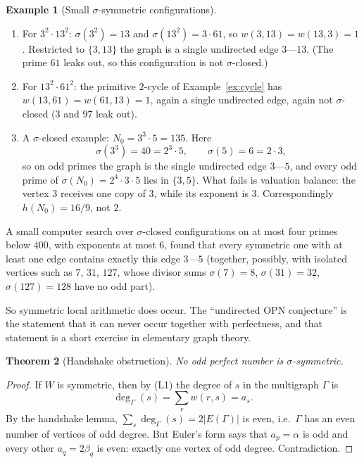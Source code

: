 \documentclass[11pt]{article}
\newtheorem{theorem}{Theorem}[section]
\theoremstyle{definition}
\newtheorem{example}[theorem]{Example}
\theoremstyle{remark}
\begin{document}
\begin{example}[Small $\sigma$-symmetric configurations]\label{ex:symmetric}
\begin{enumerate}[label=(\alph*)]
\item For $3^2\cdot13^2$: $\sigma(3^2)=13$ and $\sigma(13^2)=3\cdot61$, so
  $w(3,13)=w(13,3)=1$.  Restricted to $\{3,13\}$ the graph is a single
  undirected edge $3$---$13$.  (The prime $61$ leaks out, so this
  configuration is not $\sigma$-closed.)
\item For $13^2\cdot61^2$: the primitive $2$-cycle of
  Example~\ref{ex:cycle} has $w(13,61)=w(61,13)=1$, again a single
  undirected edge, again not $\sigma$-closed ($3$ and $97$ leak out).
\item A $\sigma$-closed example: $N_0=3^3\cdot5=135$.  Here
  \[
  \sigma(3^3)=40=2^3\cdot5,\qquad\sigma(5)=6=2\cdot3,
  \]
  so on odd primes the graph is the single undirected edge $3$---$5$, and
  every odd prime of $\sigma(N_0)=2^4\cdot3\cdot5$ lies in $\{3,5\}$.  What
  fails is valuation balance: the vertex $3$ receives one copy of $3$, while
  its exponent is $3$.  Correspondingly $h(N_0)=16/9$, not $2$.
\end{enumerate}
A small computer search over $\sigma$-closed configurations on at most four
primes below $400$, with exponents at most $6$, found that every symmetric one
with at least one edge contains exactly this edge $3$---$5$ (together, possibly,
with isolated vertices such as $7$, $31$, $127$, whose divisor sums
$\sigma(7)=8$, $\sigma(31)=32$, $\sigma(127)=128$ have no odd part).
\end{example}

So symmetric local arithmetic does occur.  The ``undirected OPN conjecture''
is the statement that it can never occur together with perfectness, and that
statement is a short exercise in elementary graph theory.

\begin{theorem}[Handshake obstruction]\label{thm:handshake}
No odd perfect number is $\sigma$-symmetric.
\end{theorem}

\begin{proof}
If $W$ is symmetric, then by (L1) the degree of $s$ in the multigraph
$\Gamma$ is
\[
\deg_\Gamma(s)=\sum_r w(r,s)=a_s .
\]
By the handshake lemma, $\sum_s\deg_\Gamma(s)=2|E(\Gamma)|$ is even, i.e.\
$\Gamma$ has an even number of vertices of odd degree.  But Euler's form says
that $a_p=\alpha$ is odd and every other $a_q=2\beta_q$ is even: exactly one
vertex of odd degree.  Contradiction.
\end{proof}
\end{document}
